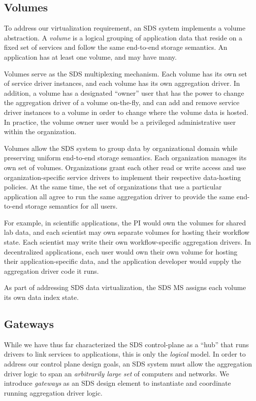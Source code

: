 \subsection{Volumes}

To address our virtualization requirement, an SDS system
implements a volume abstraction.  A \emph{volume} is a logical grouping of
application data that reside on a fixed
set of services and follow the same end-to-end storage semantics.  An
application has at least one volume, and may have many.

Volumes serve as the SDS multiplexing mechanism.  Each volume has its own set of service
driver instances, and each volume has its own aggregation driver.  In addition,
a volume has a designated ``owner'' user that has the power to
change the aggregation driver of a volume on-the-fly, and can add and remove
service driver instances to a volume in order to change where the volume data is
hosted.  In practice, the volume owner user would be a privileged administrative
user within the organization.

Volumes allow the SDS system to group data by organizational domain while
preserving uniform end-to-end storage semantics.  Each
organization manages its own set of volumes.  Organizations grant each other
read or write access and use organization-specific service drivers to implement
their respective data-hosting policies.  At the same time, the set of
organizations that use a particular application all agree to run the same aggregation
driver to provide the same end-to-end storage semantics for all users.

For example, in scientific applications, the PI would own the volumes for shared lab data, and each
scientist may own separate volumes for hosting their workflow state.  Each
scientist may write their own workflow-specific aggregation drivers.  In
decentralized applications, each user would own their own volume for hosting
their application-specific data, and the application developer would supply the
aggregation driver code it runs.

As part of addressing SDS data virtualization, the SDS MS assigns each volume 
its own data index state.

\subsection{Gateways}

While we have thus far characterized the SDS control-plane as a ``hub'' that
runs drivers to link services to applications, this is only the \emph{logical} model.
In order to address our control plane design goals, an SDS system must
allow the aggregation driver logic to
span an \emph{arbitrarily large set} of computers and networks.  We introduce
\emph{gateways} as an SDS design element to instantiate and coordinate running
aggregation driver logic.

